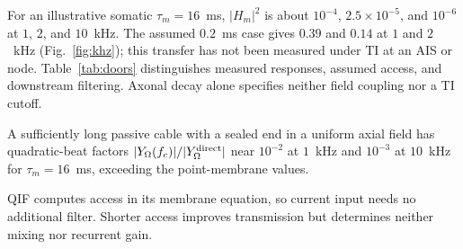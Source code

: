 For an illustrative somatic $\tau_m=16$~ms, $|H_m|^2$ is about
$10^{-4}$, $2.5\times10^{-5}$, and $10^{-6}$ at $1$, $2$, and $10$~kHz.
The assumed $0.2$~ms case gives $0.39$ and $0.14$ at $1$ and $2$~kHz
(Fig.~\ref{fig:khz}); this transfer has not been measured under TI at an
AIS or node. Table~\ref{tab:doors} distinguishes measured responses,
assumed access, and downstream filtering. Axonal decay alone specifies
neither field coupling nor a TI cutoff.

A sufficiently long passive cable with a sealed end in a uniform axial field
has quadratic-beat factors $|Y_\Omega(f_c)|/|Y_\Omega^{\rm direct}|$ near $10^{-2}$
at $1$~kHz and $10^{-3}$ at $10$~kHz for $\tau_m=16$~ms, exceeding the point-membrane
values.

QIF computes access in its membrane equation, so current input needs no additional
filter. Shorter access improves transmission but determines neither mixing nor
recurrent gain.

